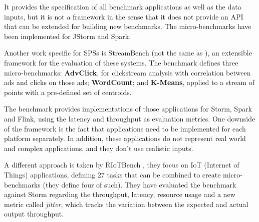 \documentclass[ppgc,diss,english]{iiufrgs}
\begin{document}
It provides the specification of all benchmark applications as well as the data inputs, but it is not a framework in the sense that it does not provide an API that can be extended for building new benchmarks. The micro-benchmarks have been implemented for JStorm and Spark.




Another work specific for SPSs is StreamBench \cite{wang2016stream} (not the same as \cite{lu2014stream}), an extensible framework for the evaluation of these systems. The benchmark defines three micro-benchmarks: \textbf{AdvClick}, for clickstream analysis with correlation between ads and clicks on those ads; \textbf{WordCount}; and \textbf{K-Means}, applied to a stream of points with a pre-defined set of centroids.

The benchmark provides implementations of those applications for Storm, Spark and Flink, using the latency and throughput as evaluation metrics. One downside of the framework is the fact that applications need to be implemented for each platform separately. In addition, these applications do not represent real world and complex applications, and they don't use realistic inputs.



A different approach is taken by RIoTBench \cite{shukla2017riotbench}, they focus on IoT (Internet of Things) applications, defining 27 tasks that can be combined to create micro-benchmarks (they define four of such). They have evaluated the benchmark against Storm regarding the throughput, latency, resource usage and a new metric called \textit{jitter}, which tracks the variation between the expected and actual output throughput.


\end{document}
